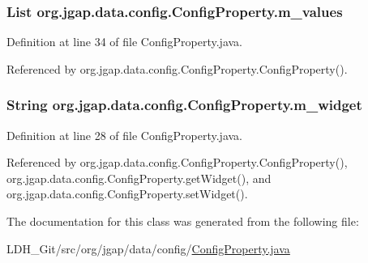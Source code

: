 \hypertarget{classorg_1_1jgap_1_1data_1_1config_1_1_config_property_a46373b38b7e1435cb50a5678d1535eac}{
\subsubsection[{m\-\_\-values}]{\setlength{\rightskip}{0pt plus 5cm}List org.\-jgap.\-data.\-config.\-Config\-Property.\-m\-\_\-values\hspace{0.3cm}{\ttfamily [private]}}}\label{classorg_1_1jgap_1_1data_1_1config_1_1_config_property_a46373b38b7e1435cb50a5678d1535eac}


Definition at line 34 of file Config\-Property.\-java.



Referenced by org.\-jgap.\-data.\-config.\-Config\-Property.\-Config\-Property().

\hypertarget{classorg_1_1jgap_1_1data_1_1config_1_1_config_property_ab3fd895227566c7b3a12150e8955e753}{
\subsubsection[{m\-\_\-widget}]{\setlength{\rightskip}{0pt plus 5cm}String org.\-jgap.\-data.\-config.\-Config\-Property.\-m\-\_\-widget\hspace{0.3cm}{\ttfamily [private]}}}\label{classorg_1_1jgap_1_1data_1_1config_1_1_config_property_ab3fd895227566c7b3a12150e8955e753}


Definition at line 28 of file Config\-Property.\-java.



Referenced by org.\-jgap.\-data.\-config.\-Config\-Property.\-Config\-Property(), org.\-jgap.\-data.\-config.\-Config\-Property.\-get\-Widget(), and org.\-jgap.\-data.\-config.\-Config\-Property.\-set\-Widget().



The documentation for this class was generated from the following file\-:\begin{DoxyCompactItemize}
\item 
L\-D\-H\-\_\-\-Git/src/org/jgap/data/config/\hyperlink{_config_property_8java}{Config\-Property.\-java}\end{DoxyCompactItemize}
